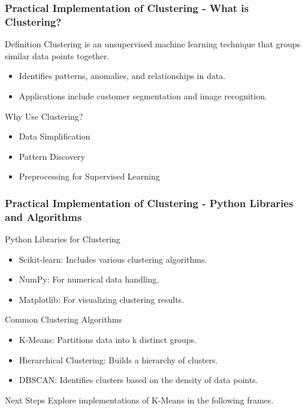 \documentclass[aspectratio=169]{beamer}
\begin{document}
\begin{frame}[fragile]
    \frametitle{Practical Implementation of Clustering - What is Clustering?}
    \begin{block}{Definition}
        Clustering is an unsupervised machine learning technique that groups similar data points together. 
    \end{block}
    
    \begin{itemize}
        \item Identifies patterns, anomalies, and relationships in data.
        \item Applications include customer segmentation and image recognition.
    \end{itemize}
    
    \begin{block}{Why Use Clustering?}
        \begin{itemize}
            \item Data Simplification
            \item Pattern Discovery
            \item Preprocessing for Supervised Learning
        \end{itemize}
    \end{block}
\end{frame}

\begin{frame}[fragile]
    \frametitle{Practical Implementation of Clustering - Python Libraries and Algorithms}
    \begin{block}{Python Libraries for Clustering}
        \begin{itemize}
            \item Scikit-learn: Includes various clustering algorithms.
            \item NumPy: For numerical data handling.
            \item Matplotlib: For visualizing clustering results.
        \end{itemize}
    \end{block}

    \begin{block}{Common Clustering Algorithms}
        \begin{itemize}
            \item K-Means: Partitions data into k distinct groups.
            \item Hierarchical Clustering: Builds a hierarchy of clusters.
            \item DBSCAN: Identifies clusters based on the density of data points.
        \end{itemize}
    \end{block}
    
    \begin{block}{Next Steps}
        Explore implementations of K-Means in the following frames.
    \end{block}
\end{frame}
\end{document}
